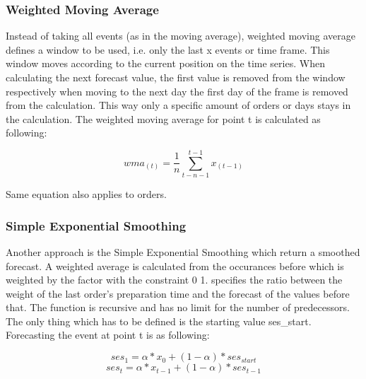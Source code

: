 \subsubsection{Weighted Moving Average}\label{subsubsection:Weighted Moving Average}
Instead of taking all events (as in the moving average), weighted moving average defines a window to be used, i.e. only the last x events or time frame. This window moves according to the current position on the time series. When calculating the next forecast value, the first value is removed from the window respectively when moving to the next day the first day of the frame is removed from the calculation. This way only a specific amount of orders or days stays in the calculation. The weighted moving average for point t is calculated as following:

\begin{center}
\begin{equation}
wma_{(t)}= \frac{1}{n}\sum^{t-1}_{t-n-1} x_{(t-1)}
\end{equation}
\end{center}
Same equation also applies to orders.

\subsubsection{Simple Exponential Smoothing}\label{subsubsection:Simple Exponential Smoothing}
Another approach is the Simple Exponential Smoothing which return a smoothed forecast. A weighted average is calculated from the occurances before which is weighted by the factor \alpha with the constraint 0 {\le} {\alpha} {\le} 1. {\alpha} specifies the ratio between the weight of the last order's preparation time and the forecast of the values before that. The function is recursive and has no limit for the number of predecessors. The only thing which has to be defined is the starting value ses_{start}. Forecasting the event at point t is as following:

\begin{center}
\begin{equation}
ses_1=\alpha*x_{0}+(1-\alpha)*ses_{start}
\end{equation}
\begin{equation}
ses_t=\alpha*x_{t-1}+(1-\alpha)*ses_{t-1}
\end{equation}
\end{center}
